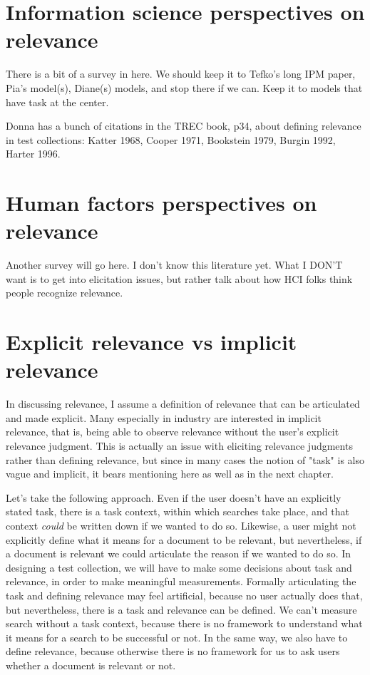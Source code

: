 \documentclass[nobib]{tufte-book}
\begin{document}
\section{Information science perspectives on relevance}

There is a bit of a survey in here.  We should keep it to Tefko's long IPM paper, Pia's model(s), Diane(s) models, and stop there if we can.  Keep it to models that have task at the center.

Donna has a bunch of citations in the TREC book, p34, about defining relevance in test collections: Katter 1968, Cooper 1971, Bookstein 1979, Burgin 1992, Harter 1996.

\section{Human factors perspectives on relevance}

Another survey will go here.  I don't know this literature yet.  What I DON'T want is to get into elicitation issues, but rather talk about how HCI folks think people recognize relevance.

\section{Explicit relevance vs implicit relevance}

In discussing relevance, I assume a definition of relevance that can be articulated and made explicit.  Many especially in industry are interested in implicit relevance, that is, being able to observe relevance without the user's explicit relevance judgment.  This is actually an issue with eliciting relevance judgments rather than defining relevance, but since in many cases the notion of "task" is also vague and implicit, it bears mentioning here as well as in the next chapter.

Let's take the following approach.  Even if the user doesn't have an explicitly stated task, there is a task context, within which searches take place, and that context {\em could} be written down if we wanted to do so.  Likewise, a user might not explicitly define what it means for a document to be relevant, but nevertheless, if a document is relevant we could articulate the reason if we wanted to do so.  In designing a test collection, we will have to make some decisions about task and relevance, in order to make meaningful measurements.  Formally articulating the task and defining relevance may feel artificial, because no user actually does that, but nevertheless, there is a task and relevance can be defined.  We can't measure search without a task context, because there is no framework to understand what it means for a search to be successful or not.  In the same way, we also have to define relevance, because otherwise there is no framework for us to ask users whether a document is relevant or not.
\end{document}

